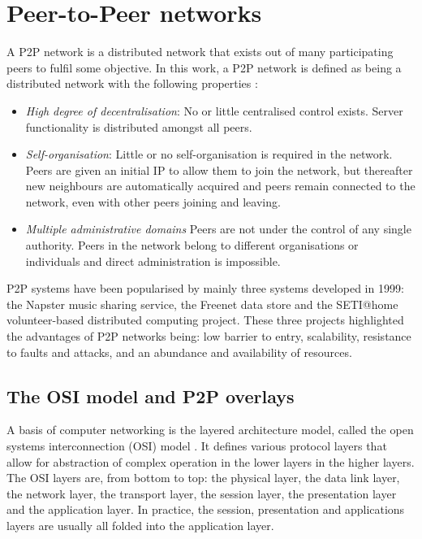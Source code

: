 \section{Peer-to-Peer networks}

A P2P network is a distributed network that exists out of many participating peers to fulfil some objective. In this work, a P2P network is defined as being a distributed network with the following properties
\cite{Rodrigues_acm_comms_p2p}:
%
\begin{itemize}
\item \emph{High degree of decentralisation}:  No or little centralised control exists. Server functionality is distributed amongst all peers.
\item \emph{Self-organisation}: Little or no self-organisation is required in the network. Peers are given an initial IP to allow them to join the network, but thereafter new neighbours are automatically acquired and peers remain connected to the network, even with other peers joining and leaving.
\item \emph{Multiple administrative domains} Peers are not under the control of any single authority. Peers in the network belong to different organisations or individuals and direct administration is impossible.
\end{itemize}

P2P systems have been popularised by mainly three systems developed in 1999: the Napster music sharing service, the Freenet data store and the SETI@home volunteer-based distributed computing project. These three projects highlighted the advantages of P2P networks being: low barrier to entry, scalability, resistance to faults and attacks, and an abundance and availability of resources.

\subsection{The OSI model and P2P overlays}

A basis of computer networking is the layered architecture model, called the open systems interconnection (OSI) model \cite{OSI_protocol_stack}. It defines various protocol layers that allow for abstraction of complex operation in the lower layers in the higher layers. The OSI layers are, from bottom to top: the physical layer, the data link layer, the network layer, the transport layer, the session layer, the presentation layer and the application layer. In practice, the session, presentation and applications layers are usually all folded into the application layer.

